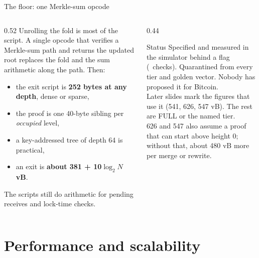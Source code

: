\documentclass[aspectratio=169,10pt]{beamer}
\begin{document}
\begin{frame}{The floor: one Merkle-sum opcode}
  \begin{columns}[T]
    \begin{column}{0.52\textwidth}
      Unrolling the fold is most of the script. A single opcode that verifies a Merkle-sum path and returns the updated root replaces the fold and the sum arithmetic along the path. Then:
      \begin{itemize}
        \item the exit script is \textbf{252 bytes at any depth}, dense or sparse,
        \item the proof is one 40-byte sibling per \emph{occupied} level,
        \item a key-addressed tree of depth 64 is practical,
        \item an exit is \textbf{about 381 + 10$\log_2 N$ vB}.
      \end{itemize}
      The scripts still do arithmetic for pending receives and lock-time checks.
    \end{column}
    \begin{column}{0.44\textwidth}
      \begin{block}{Status}
        Specified and measured in the simulator behind a  flag (\nChecksMSU\ checks).
        Quarantined from every tier and golden vector.
        Nobody has proposed it for Bitcoin.\\[0.4em]
        Later slides mark the figures that use it (541, 626, 547 vB). The rest are FULL or the named tier.\\[0.4em]
        626 and 547 also assume a proof that can start above height 0; without that, about 480 vB more per merge or rewrite.
      \end{block}
    \end{column}
  \end{columns}
\end{frame}

\section{Performance and scalability}
\end{document}
